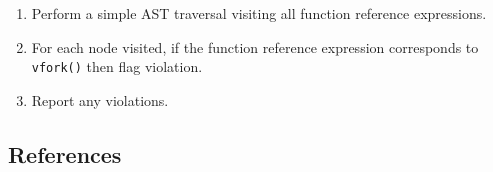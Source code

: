 \begin{enumerate}
\item Perform a simple AST traversal visiting all function reference expressions.
\item For each node visited, if the function reference expression corresponds to {\tt vfork()} then flag violation.
\item Report any violations.
\end{enumerate}

\subsection{References}

